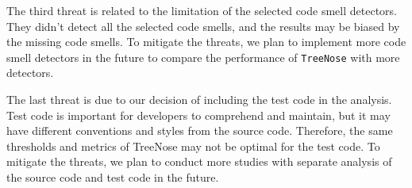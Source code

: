 The third threat is related to the limitation of the selected code smell
detectors. They didn't detect all the selected code smells, and the results may
be biased by the missing code smells. To mitigate the threats, we plan to
implement more code smell detectors in the future to compare the performance of
\texttt{TreeNose} with more detectors.



The last threat is due to our decision of including the test code in the
analysis. Test code is important for developers to comprehend and maintain, but
it may have different conventions and styles from the source code. Therefore,
the same thresholds and metrics of TreeNose may not be optimal for the test
code. To mitigate the threats, we plan to conduct more studies with separate
analysis of the source code and test code in the future.
